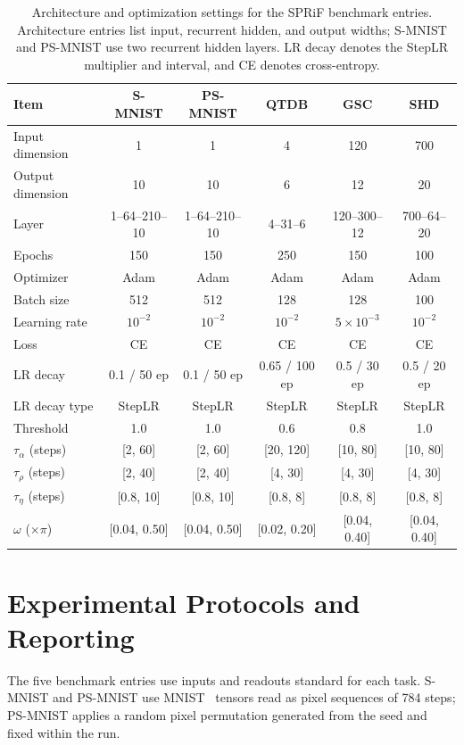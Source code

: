 \documentclass[letterpaper]{article}
\begin{document}
\begin{table}[tbp]
\centering
\small
\setlength{\tabcolsep}{3pt}
\begin{tabular}{lccccc}
\toprule
Item & S-MNIST & PS-MNIST & QTDB & GSC & SHD \\
\midrule
Input dimension & 1 & 1 & 4 & 120 & 700 \\
Output dimension & 10 & 10 & 6 & 12 & 20 \\
Layer & 1--64--210--10 & 1--64--210--10 & 4--31--6 & 120--300--12 & 700--64--20 \\
Epochs & 150 & 150 & 250 & 150 & 100 \\
Optimizer & Adam & Adam & Adam & Adam & Adam \\
Batch size & 512 & 512 & 128 & 128 & 100 \\
Learning rate & $10^{-2}$ & $10^{-2}$ & $10^{-2}$ & $5\times10^{-3}$ & $10^{-2}$ \\
Loss & CE & CE & CE & CE & CE \\
LR decay & 0.1 / 50 ep & 0.1 / 50 ep & 0.65 / 100 ep & 0.5 / 30 ep & 0.5 / 20 ep \\
LR decay type & StepLR & StepLR & StepLR & StepLR & StepLR \\
Threshold & 1.0 & 1.0 & 0.6 & 0.8 & 1.0 \\
$\tau_\alpha$ (steps) & [2, 60] & [2, 60] & [20, 120] & [10, 80] & [10, 80] \\
$\tau_\rho$ (steps) & [2, 40] & [2, 40] & [4, 30] & [4, 30] & [4, 30] \\
$\tau_\eta$ (steps) & [0.8, 10] & [0.8, 10] & [0.8, 8] & [0.8, 8] & [0.8, 8] \\
$\omega$ ($\times\pi$) & [0.04, 0.50] & [0.04, 0.50] & [0.02, 0.20] & [0.04, 0.40] & [0.04, 0.40] \\
\bottomrule
\end{tabular}
\caption{Architecture and optimization settings for the SPRiF benchmark entries. Architecture entries list input, recurrent hidden, and output widths; S-MNIST and PS-MNIST use two recurrent hidden layers. LR decay denotes the StepLR multiplier and interval, and CE denotes cross-entropy.}
\label{tab:supp_arch}
\end{table}

\section{Experimental Protocols and Reporting}
\label{supp:sec:protocols}

The five benchmark entries use inputs and readouts standard for each task. S-MNIST and PS-MNIST use MNIST~\cite{lecun1998gradient} tensors read as pixel sequences of 784 steps; PS-MNIST applies a random pixel permutation generated from the seed and fixed within the run.
\end{document}
